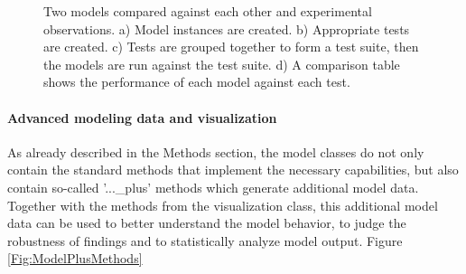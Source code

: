 \documentclass[a4paper,10pt]{article}
\begin{document}
\begin{figure}
\caption{Two models compared against each other and experimental observations. a) Model instances are created. b) Appropriate tests are created. c) Tests are grouped together to form a test suite, then the models
are run against the test suite. d) A comparison table shows the performance of each model against each test.}
\label{Fig:ModelComparisons}
\end{figure}

\paragraph{Advanced modeling data and visualization}
As already described in the Methods section, the model classes do not only contain the standard methods that implement the necessary capabilities, but also contain so-called '...\_plus' methods 
which generate additional model data. Together with the methods from the visualization class, this additional model data can be used to better understand the model behavior, 
to judge the robustness of findings and to statistically analyze model output. Figure \ref{Fig:ModelPlusMethods}
\end{document}
